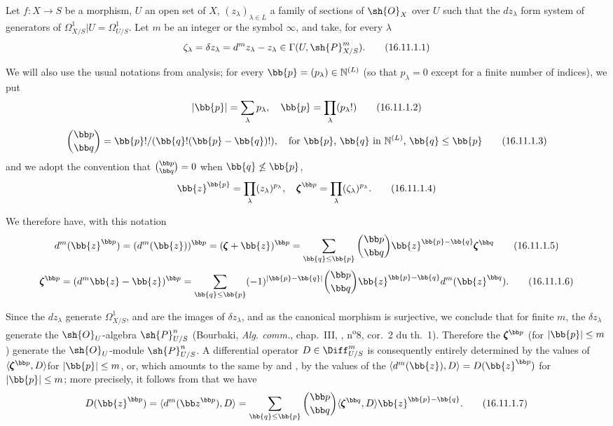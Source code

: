 \begin{env}[16.11.1]
\label{IV.16.11.1}
Let $f:X \to S$ be a morphism, $U$ an open set of $X$, $(z_\lambda)_{\lambda \in L}$ a family of sections of $\sh{O}_X$ over $U$ such that the $dz_\lambda$ form system of generators of $\Omega_{X/S}^1|U = \Omega_{U/S}^1$.
Let $m$ be an integer or the symbol $\infty$, and take, for every $\lambda$
\[
  \label{IV.16.11.1.1}
  \zeta_\lambda = \delta z_\lambda = d^m z_\lambda - z_\lambda \in \Gamma(U, \sh{P}_{X/S}^m).
  \tag{16.11.1.1}
\]

We will also use the usual notations from analysis;
for every $\bb{p} = (p_\lambda) \in \mathbb{N}^{(L)}$ (so that $p_\lambda = 0$ except for a finite number of indices), we put
\[
  \label{IV.16.11.1.2}
  |\bb{p}| = \sum_\lambda p_\lambda, \quad \bb{p} = \prod_\lambda (p_\lambda!)
  \tag{16.11.1.2}
\]
\[
  \label{IV.16.11.1.3}
  \binom{\bb p}{\bb q} = \bb{p}!/(\bb{q}!(\bb{p} - \bb{q})!), \quad \text{for $\bb{p}$, $\bb{q}$ in $\mathbb{N}^{(L)}$, $\bb{q} \leq \bb{p}$}
  \tag{16.11.1.3}
\]
and we adopt the convention that $\binom{\bb p}{\bb q} = 0$ when $\bb{q} \not\leq \bb{p}$,
\[
  \label{IV.16.11.1.4}
  \bb{z}^\bb{p} = \prod_\lambda (z_\lambda)^{p_\lambda}, \quad {\pmb\zeta}^{\bb p} = \prod_\lambda (\zeta_\lambda)^{p_\lambda}.
  \tag{16.11.1.4}
\]

We therefore have, with this notation
\[
  \label{IV.16.11.1.5}
  d^m(\bb{z}^{\bb p}) = (d^m(\bb{z}))^{\bb p} = (\pmb{\zeta} + \bb{z})^{\bb p} = \sum_{\bb{q} \leq \bb{p}} \binom{\bb p}{\bb q} \bb{z}^{\bb{p} - \bb{q}} \pmb{\zeta}^{\bb q}
  \tag{16.11.1.5}
\]
\[
  \label{IV.16.11.1.6}
  \pmb{\zeta}^{\bb p} = (d^m \bb{z} - \bb{z})^{\bb p} =  \sum_{\bb{q} \leq \bb{p}} (-1)^{|\bb{p} - \bb{q}|} \binom{\bb p}{\bb q} \bb{z}^{\bb{p} - \bb{q}} d^m(\bb{z}^{\bb q}).
  \tag{16.11.1.6}
\]
  
Since the $dz_\lambda$ generate $\Omega_{X/S}^1$, and are the images of $\delta z_\lambda$, and as the canonical morphism  is surjective, we conclude that for finite $m$, the $\delta z_\lambda$ generate the $\sh{O}_U$-algebra $\sh{P}_{U/S}^n$ (Bourbaki, \emph{Alg. comm.}, chap.~III, , n\textsuperscript{o}8, cor.\ 2 du th.\ 1).
Therefore the $\pmb{\zeta}^{\bb p}$ (for $|\bb{p}| \leq m$) generate the $\sh{O}_U$-module $\sh{P}_{U/S}^n$.
A differential operator $D \in \Diff_{U/S}^m$ is consequently entirely determined by the values of $\langle \pmb{\zeta}^{\bb p}, D \rangle $for $|\bb{p}| \leq m$, or, which amounts to the same by  and , by the values
of the $\langle d^m(\bb{z}), D \rangle = D(\bb{z}^{\bb p})$ for $|\bb{p}| \leq m$;
more precisely, it follows from  that we have
\[
  \label{IV.16.11.1.7}
  D(\bb{z}^{\bb p}) = \langle d^m({\bb z}^{\bb p}), D \rangle = \sum_{\bb{q} \leq \bb{p}} \binom{\bb p}{\bb q} \langle \pmb{\zeta}^{\bb q} , D \rangle \bb{z}^{\bb{p} - \bb{q}}.
  \tag{16.11.1.7}
\]
\end{env}

